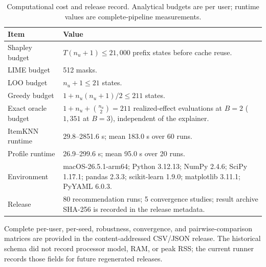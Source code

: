 \begin{table}[!htbp]
\centering\scriptsize
\caption{Computational cost and release record. Analytical budgets are per user; runtime values are complete-pipeline measurements.}
\label{tab:app-computation}
\begin{tabular}{@{}p{}p{}@{}}
\toprule
Item & Value \\
\midrule
Shapley budget & $T(n_u+1)\le21{,}000$ prefix states before cache reuse. \\
LIME budget & 512 masks. \\
LOO budget & $n_u+1\le21$ states. \\
Greedy budget & $1+n_u(n_u+1)/2\le211$ states. \\
Exact oracle budget & $1+n_u+\binom{n_u}{2}=211$ realized-effect evaluations at $B=2$ ($1{,}351$ at $B=3$), independent of the explainer. \\
ItemKNN runtime & 29.8--2851.6 s; mean 183.0 s over 60 runs. \\
Profile runtime & 26.9--299.6 s; mean 95.0 s over 20 runs. \\
Environment & macOS-26.5.1-arm64; Python 3.12.13; NumPy 2.4.6; SciPy 1.17.1; pandas 2.3.3; scikit-learn 1.9.0; matplotlib 3.11.1; PyYAML 6.0.3. \\
Release & 80 recommendation runs; 5 convergence studies; result archive SHA-256 is recorded in the release metadata. \\
\bottomrule
\end{tabular}
\end{table}

\noindent Complete per-user, per-seed, robustness, convergence, and pairwise-comparison matrices are provided in the content-addressed CSV/JSON release. The historical schema did not record processor model, RAM, or peak RSS; the current runner records those fields for future regenerated releases.

